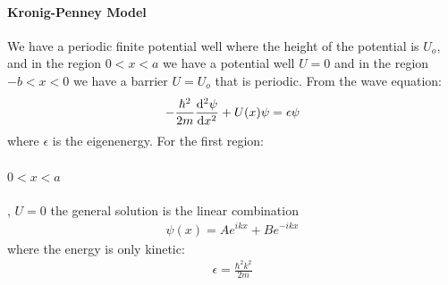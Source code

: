\documentclass[../main.tex]{subfiles}
\begin{document}
\paragraph*{Kronig-Penney Model} We have a periodic finite potential well where 
the height of the potential is $U_o$, and in the region $0 < x < a$ we have a potential well
$U = 0$ and in the region $-b < x < 0$ we have a barrier $U = U_o$ that is periodic. From the 
wave equation:
\begin{align*}
    -\frac{\hbar^2}{2m} \dv[2]{\psi}{x} + U(x) \psi = \epsilon \psi
\end{align*}
where $\epsilon$ is the eigenenergy. For the first region:
\paragraph*{$0 < x < a$}, $U = 0$ the general solution is the linear combination
\begin{align*}
    \psi(x) = A e^{ikx} + B e^{-ikx}
\end{align*}
where the energy is only kinetic:
\begin{align*}
    \epsilon = \frac{\hbar^2 k^2}{2m}
\end{align*}
\end{document}
